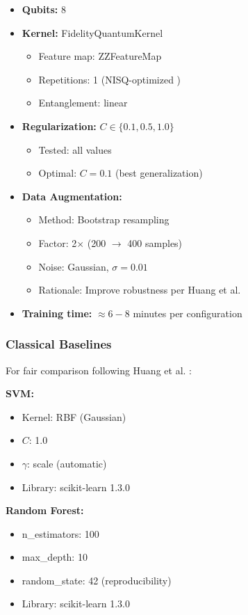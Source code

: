 \documentclass[11pt,letterpaper]{article}
\begin{document}
\begin{itemize}
\item \textbf{Qubits:} 8
\item \textbf{Kernel:} FidelityQuantumKernel \cite{havlicek2019supervised}
\begin{itemize}
\item Feature map: ZZFeatureMap
\item Repetitions: 1 (NISQ-optimized \cite{preskill2018quantum})
\item Entanglement: linear
\end{itemize}
\item \textbf{Regularization:} $C \in \{0.1, 0.5, 1.0\}$
\begin{itemize}
\item Tested: all values
\item Optimal: $C=0.1$ (best generalization)
\end{itemize}
\item \textbf{Data Augmentation:}
\begin{itemize}
\item Method: Bootstrap resampling
\item Factor: 2$\times$ (200 $\rightarrow$ 400 samples)
\item Noise: Gaussian, $\sigma=0.01$
\item Rationale: Improve robustness per Huang et al. \cite{huang2021power}
\end{itemize}
\item \textbf{Training time:} $\approx 6-8$ minutes per configuration
\end{itemize}

\subsubsection{Classical Baselines}

For fair comparison following Huang et al. \cite{huang2021power}:

\textbf{SVM:}
\begin{itemize}
\item Kernel: RBF (Gaussian)
\item $C$: 1.0
\item $\gamma$: scale (automatic)
\item Library: scikit-learn 1.3.0
\end{itemize}

\textbf{Random Forest:}
\begin{itemize}
\item n\_estimators: 100
\item max\_depth: 10
\item random\_state: 42 (reproducibility)
\item Library: scikit-learn 1.3.0
\end{itemize}
\end{document}
